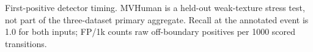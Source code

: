 \begin{table}[t]
  \centering
  \caption{First-positive detector timing. MVHuman is a held-out weak-texture
  stress test, not part of the three-dataset primary aggregate. Recall at the
  annotated event is 1.0 for both inputs; FP/1k counts raw off-boundary
  positives per 1000 scored transitions.}
  \label{tab:detector-generalization}
  \scriptsize
  \resizebox{\columnwidth}{!}{%
    }
\end{table}
